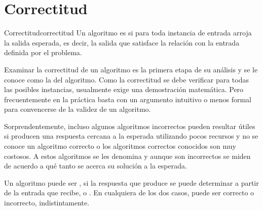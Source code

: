 \section{Correctitud}
\label{sec:correctitud}

\begin{definicion}{Correctitud}{correctitud}
  Un algoritmo es  si para toda instancia de entrada arroja la salida esperada, es decir, la salida que satisface la relación con la entrada definida por el problema.
\end{definicion}

Examinar la correctitud de un algoritmo es la primera etapa de su análisis y se le conoce como la  del algoritmo. Como la correctitud se debe verificar para todas las posibles instancias, usualmente exige una demostración matemática. Pero frecuentemente en la práctica basta con un argumento intuitivo o menos formal para convencerse de la validez de un algoritmo.

Sorprendentemente, incluso algunos algoritmos incorrectos pueden resultar útiles si producen una respuesta cercana a la esperada utilizando pocos recursos y no se conoce un algoritmo correcto o los algoritmos correctos conocidos son muy costosos. A estos algoritmos se les denomina  y aunque son incorrectos se miden de acuerdo a qué tanto se acerca su solución a la esperada.

Un algoritmo puede ser , si la respuesta que produce se puede determinar a partir de la entrada que recibe, o . En cualquiera de los dos casos, puede ser correcto o incorrecto, indistintamente.
